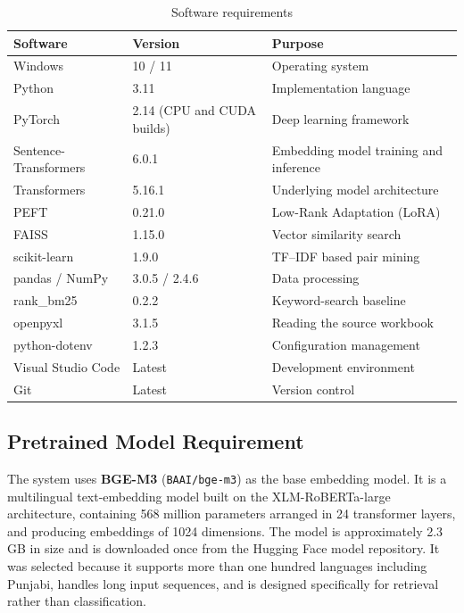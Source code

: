 \documentclass[12pt,a4paper]{article}
\begin{document}
\begin{table}[H]
\centering
\renewcommand{\arraystretch}{1.35}
\caption{Software requirements}
\begin{tabular}{|p{4.6cm}|p{3.0cm}|p{6.2cm}|}
\hline
\textbf{Software} & \textbf{Version} & \textbf{Purpose} \\
\hline
Windows & 10 / 11 & Operating system \\
\hline
Python & 3.11 & Implementation language \\
\hline
PyTorch & 2.14 (CPU and CUDA builds) & Deep learning framework \\
\hline
Sentence-Transformers & 6.0.1 & Embedding model training and inference \\
\hline
Transformers & 5.16.1 & Underlying model architecture \\
\hline
PEFT & 0.21.0 & Low-Rank Adaptation (LoRA) \\
\hline
FAISS & 1.15.0 & Vector similarity search \\
\hline
scikit-learn & 1.9.0 & TF--IDF based pair mining \\
\hline
pandas / NumPy & 3.0.5 / 2.4.6 & Data processing \\
\hline
rank\_bm25 & 0.2.2 & Keyword-search baseline \\
\hline
openpyxl & 3.1.5 & Reading the source workbook \\
\hline
python-dotenv & 1.2.3 & Configuration management \\
\hline
Visual Studio Code & Latest & Development environment \\
\hline
Git & Latest & Version control \\
\hline
\end{tabular}
\end{table}

\subsection{Pretrained Model Requirement}

The system uses \textbf{BGE-M3} (\texttt{BAAI/bge-m3}) \cite{chen2024bgem3} as the base embedding model. It is a multilingual text-embedding model built on the XLM-RoBERTa-large architecture, containing 568 million parameters arranged in 24 transformer layers, and producing embeddings of 1024 dimensions. The model is approximately 2.3 GB in size and is downloaded once from the Hugging Face model repository. It was selected because it supports more than one hundred languages including Punjabi, handles long input sequences, and is designed specifically for retrieval rather than classification.
\end{document}

